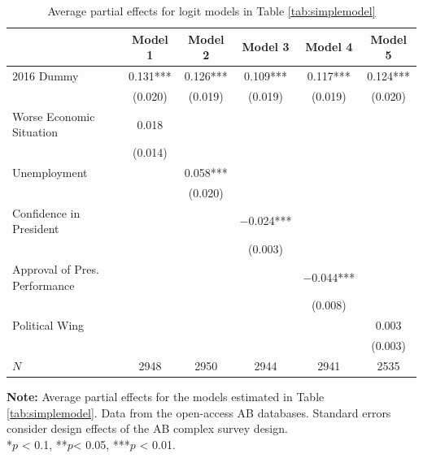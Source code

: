 \documentclass[12pt,a4]{article}\usepackage[]{graphicx}\usepackage[]{xcolor}
\begin{document}
\begin{table}[htbp]
\caption{Average partial effects for logit models in Table \ref{tab:simplemodel}}
\label{tab:apesimp}

\begin{tabular}[t]{lccccc}
\toprule
  & Model 1 & Model 2 & Model 3 & Model 4 & Model 5\\
\midrule
2016 Dummy & \num{0.131}*** & \num{0.126}*** & \num{0.109}*** & \num{0.117}*** & \num{0.124}***\\
 & (\num{0.020}) & (\num{0.019}) & (\num{0.019}) & (\num{0.019}) & (\num{0.020})\\
Worse Economic Situation & \num{0.018} &  &  &  & \\
 & (\num{0.014}) &  &  &  & \\
Unemployment &  & \num{0.058}*** &  &  & \\
 &  & (\num{0.020}) &  &  & \\
Confidence in President &  &  & \num{-0.024}*** &  & \\
 &  &  & (\num{0.003}) &  & \\
Approval of Pres. Performance &  &  &  & \num{-0.044}*** & \\
 &  &  &  & (\num{0.008}) & \\
Political Wing &  &  &  &  & \num{0.003}\\
 &  &  &  &  & (\num{0.003})\\
\midrule
$N$ & \num{2948} & \num{2950} & \num{2944} & \num{2941} & \num{2535}\\
\bottomrule
\end{tabular}


\vspace{0.25cm}
\textbf{Note:} Average partial effects for the models estimated in Table \ref{tab:simplemodel}. Data from the open-access AB databases. Standard errors consider design effects of the AB complex survey design.\\
*$p$ < 0.1, **$p$< 0.05, ***$p$ < 0.01.
\end{table}





\end{document}
